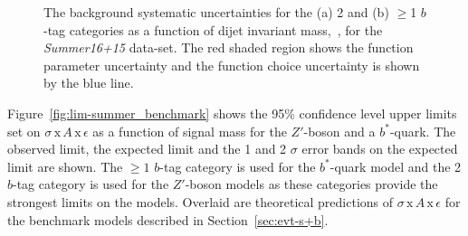 \begin{figure}[!ht]
  \begin{center}
    \captionsetup[subfigure]{aboveskip=0pt,justification=centering}
  \end{center}
  \vspace{-1mm}
  \caption{The background systematic uncertainties for the (a) 2 and (b) $\geq$1 $b$-tag categories
    as a function of dijet invariant mass,~\mjj, for the \textit{Summer16+15} data-set.
    The red shaded region shows the function parameter uncertainty and the
    function choice uncertainty is shown by the blue line. }
  \label{fig:lim-summer_systBkg}
\end{figure}

Figure~\ref{fig:lim-summer_benchmark} shows the
95\% confidence level upper limits set on $\sigma\,\text{x}\,\mathit{A}\,\text{x}\,\epsilon$
as a function of signal mass
for the $Z'$-boson and a $b^*$-quark.
The observed limit, the expected limit and the 1 and 2 $\sigma$ error bands on the expected limit are shown.
The $\geq1$ $b$-tag category is used for the $b^*$-quark model
and the 2 $b$-tag category is used for the $Z'$-boson models
as these categories provide the strongest limits on the models.
Overlaid are theoretical predictions of
$\sigma\,\text{x}\,\mathit{A}\,\text{x}\,\epsilon$ for the benchmark models described in Section~\ref{sec:evt-s+b}.

